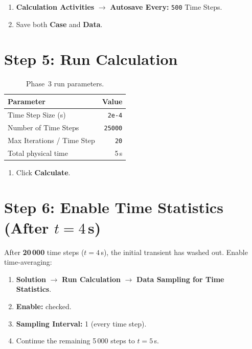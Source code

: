 \documentclass[12pt,a4paper]{report}
\begin{document}
\begin{enumerate}
  \item \textbf{Calculation Activities} $\rightarrow$
        \textbf{Autosave Every:} \texttt{500} Time Steps.
  \item Save both \textbf{Case} and \textbf{Data}.
\end{enumerate}


\section{Step 5: Run Calculation}

\begin{table}[H]
\centering
\caption{Phase~3 run parameters.}
\begin{tabular}{@{}lr@{}}
\toprule
\textbf{Parameter} & \textbf{Value} \\
\midrule
Time Step Size (s)         & \texttt{2e-4} \\
Number of Time Steps       & \texttt{25000} \\
Max Iterations / Time Step & \texttt{20} \\
\midrule
Total physical time        & 5\,s \\
\bottomrule
\end{tabular}
\end{table}

\begin{enumerate}
  \item Click \textbf{Calculate}.
\end{enumerate}


\section{Step 6: Enable Time Statistics (After $t = 4$\,s)}

After \textbf{20\,000} time steps ($t = 4$\,s), the initial transient
has washed out.  Enable time-averaging:

\begin{enumerate}
  \item \textbf{Solution} $\rightarrow$ \textbf{Run Calculation}
        $\rightarrow$ \textbf{Data Sampling for Time Statistics}.
  \item \textbf{Enable:} checked.
  \item \textbf{Sampling Interval:} 1 (every time step).
  \item Continue the remaining 5\,000 steps to $t = 5$\,s.
\end{enumerate}
\end{document}
